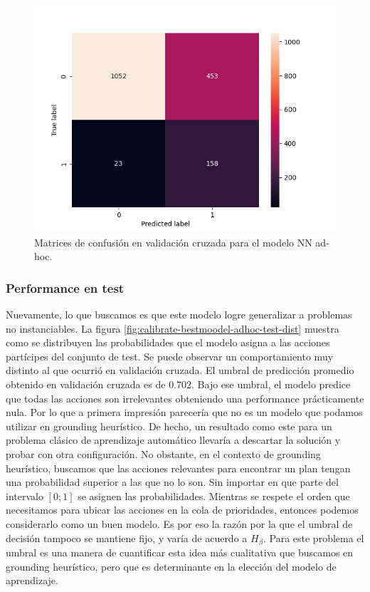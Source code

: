 \begin{figure}[h!]
    \includegraphics[width=\linewidth]{figures/results/ad-hoc/nn/calibrate/2021-12-06_17.03.17.314982_set_5_confusion_matrix_raw.png}
    \endminipage
    \caption{Matrices de confusión en validación cruzada para el modelo NN ad-hoc.}
    \label{fig:calibrate-bestmodel-cm}
\end{figure}

\subsubsection{Performance en test}


Nuevamente, lo que buscamos es que este modelo logre generalizar a problemas no
instanciables. La figura \ref{fig:calibrate-bestmoodel-adhoc-test-dist} muestra como
se distribuyen las probabilidades que el modelo asigna a las acciones partícipes
del conjunto de test. Se puede observar un comportamiento muy distinto al que
ocurrió en validación cruzada. El umbral de predicción promedio obtenido en
validación cruzada es de 0.702. Bajo ese umbral, el modelo predice que todas las
acciones son irrelevantes obteniendo una performance prácticamente nula. Por lo
que a primera impresión parecería que no es un modelo que podamos utilizar en
grounding heurístico. De hecho, un resultado como este para un problema clásico
de aprendizaje automático llevaría a descartar la solución y probar con otra
configuración. No obstante, en el contexto de grounding heurístico, buscamos que
las acciones relevantes para encontrar un plan tengan una probabilidad superior
a las que no lo son. Sin importar en que parte del intervalo $[0;1]$ se asignen
las probabilidades. Mientras se respete el orden que necesitamos para ubicar las
acciones en la cola de prioridades, entonces podemos considerarlo como un buen
modelo. Es por eso la razón por la que el umbral de decisión tampoco se mantiene
fijo, y varía de acuerdo a $H_{\beta}$. Para este problema el umbral es una
manera de cuantificar esta idea más cualitativa que buscamos en grounding
heurístico, pero que es determinante en la elección del modelo de aprendizaje.

